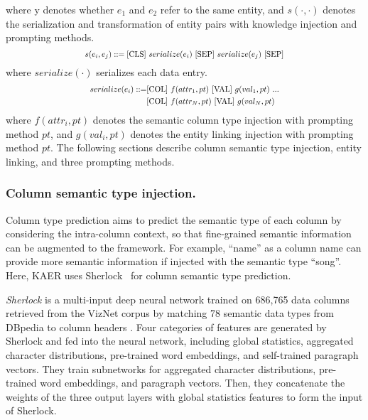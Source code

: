 where y denotes whether $e_1$ and $e_2$ refer to the same entity, and $s(\cdot,\cdot)$ denotes the serialization and transformation of entity pairs with knowledge injection and prompting methods. 
\begin{equation}
\Scale[0.8]{
    s(e_i, e_j) ::=  \text{[CLS]}\ serialize(e_i)\ \text{[SEP]}\ serialize(e_j)\ \text{[SEP]}} 
\end{equation}
where $serialize(\cdot)$ serializes each data entry.
\begin{equation}\Scale[0.8]{
\begin{split}
serialize(e_i) ::= & \text{[COL]}\ f(attr_1,pt)\ \text{[VAL]}\ g(val_1,pt)\ ...\\
            & \text{[COL]}\ f(attr_N,pt)\ \text{[VAL]}\ g(val_N,pt)   
\end{split}}
\end{equation}
where $f(attr_i, pt)$ denotes the semantic column type injection with prompting method $pt$, and $g(val_i, pt)$ denotes the entity linking injection with prompting method $pt$. The following sections describe  column semantic type injection, entity linking, and three prompting methods.


\subsubsection{Column semantic type injection.}
Column type prediction aims to predict the semantic type of each column by considering the intra-column context, so that fine-grained semantic information can be augmented to the framework. For example, ``name'' as a column name can provide more semantic information if injected with the semantic type ``song''. Here, KAER uses Sherlock~\cite{hulsebos_sherlock_2019} for column semantic type prediction. %


\textit{Sherlock} is a multi-input deep neural network trained on 686,765 data columns retrieved from the VizNet corpus by matching 78 semantic data types from DBpedia to column headers \cite{hulsebos_sherlock_2019}. Four categories of features are generated by Sherlock and fed into the neural network, including global statistics, aggregated character distributions, pre-trained word embeddings, and self-trained paragraph vectors. They train subnetworks for aggregated character distributions, pre-trained word embeddings, and paragraph vectors. Then, they concatenate the weights of the three output layers with global statistics features to form the input of Sherlock.

